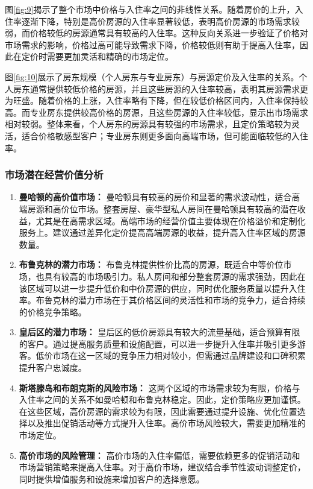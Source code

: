 \documentclass[12pt]{article}
\begin{document}
\begin{CJK}{UTF8}{gbsn}
	
	图\ref{fig:9}揭示了整个市场中价格与入住率之间的非线性关系。随着房价的上升，入住率逐渐下降，特别是高价房源的入住率显著较低，表明高价房源的市场需求较弱，而价格较低的房源通常具有较高的入住率。这种反向关系进一步验证了价格对市场需求的影响，价格过高可能导致需求下降，价格较低则有助于提高入住率，因此在定价时需要更加灵活和精确的市场定位。
	
	图\ref{fig:10}展示了房东规模（个人房东与专业房东）与房源定价及入住率的关系。个人房东通常提供较低价格的房源，并且这些房源的入住率较高，表明其房源需求更为旺盛。随着价格的上涨，入住率略有下降，但在较低价格区间内，入住率保持较高。而专业房东提供较高价格的房源，且这些房源的入住率较低，显示出市场需求相对较弱。整体来看，个人房东的房源具有较强的市场需求，且定价策略较为灵活，适合价格敏感型客户；专业房东则更多面向高端市场，但可能面临较低的入住率。
	
	\subsubsection{市场潜在经营价值分析}
	\begin{enumerate}
		\item \textbf{曼哈顿的高价值市场：} 曼哈顿具有较高的房价和显著的需求波动性，适合高端房源和高价位市场。整套房屋、豪华型私人房间在曼哈顿具有较高的潜在收益，尤其是在高需求区域。高端市场的经营价值主要体现在价格溢价和定制化服务上。建议通过差异化定价提高高端房源的收益，提升高入住率区域的房源数量。
		\item \textbf{布鲁克林的潜力市场：} 布鲁克林提供性价比高的房源，既适合中等价位市场，也具有较高的市场吸引力。私人房间和部分整套房源的需求强劲，因此在该区域可以进一步提升低价和中价房源的供应，同时优化服务质量以提升入住率。布鲁克林的潜力市场在于其价格区间的灵活性和市场的竞争力，适合持续的价格竞争策略。
		\item \textbf{皇后区的潜力市场：} 皇后区的低价房源具有较大的流量基础，适合预算有限的客户。通过提高服务质量和设施配置，可以进一步提升入住率并吸引更多游客。低价市场在这一区域的竞争压力相对较小，但需通过品牌建设和口碑积累提升客户忠诚度。
		\item \textbf{斯塔滕岛和布朗克斯的风险市场：} 这两个区域的市场需求较为有限，价格与入住率之间的关系不如曼哈顿和布鲁克林稳定。因此，定价策略应更加谨慎。在这些区域，高价房源的需求较为有限，因此需要通过提升设施、优化位置选择以及推出促销活动等方式提升入住率。高价市场风险较大，需要更加精准的市场定位。
		\item \textbf{高价市场的风险管理：} 高价市场的入住率偏低，需要依赖更多的促销活动和市场营销策略来提高入住率。对于高价市场，建议结合季节性波动调整定价，同时提供增值服务和设施来增加客户的选择意愿。
	\end{enumerate}
	

\end{CJK}
\end{document}
